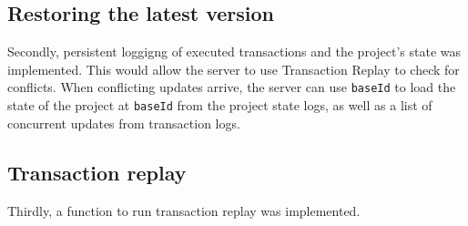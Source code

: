 \documentclass[a4paper, 11pt, oneside]{article}
\theoremstyle{definition}
\begin{document}
\subsection*{Restoring the latest version}

Secondly, persistent loggigng of executed transactions and the project's state was implemented. This would allow the server to use Transaction Replay to check for conflicts. When conflicting updates arrive, the server can use \verb|baseId| to load the state of the project at \verb|baseId| from the project state logs, as well as a list of concurrent updates from transaction logs.

\subsection{Transaction replay}

Thirdly, a function to run transaction replay was implemented.





\newpage
\printbibliography
\clearpage
\end{document}
